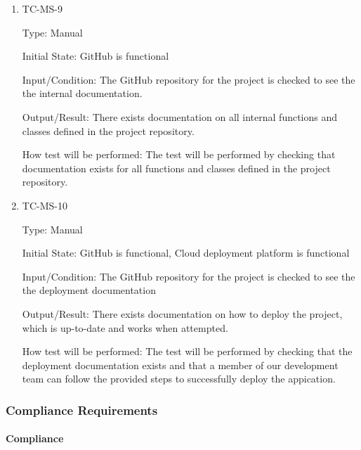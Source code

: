 \documentclass[12pt, titlepage]{article}
\begin{document}
\begin{enumerate}
  \item{TC-MS-9\\}

    Type: Manual

    Initial State: GitHub is functional

    Input/Condition: The GitHub repository for the project is checked
    to see the the internal documentation.

    Output/Result: There exists documentation on all internal
    functions and classes defined in the project repository.

    How test will be performed: The test will be performed by
    checking that documentation exists for all functions and classes
    defined in the project repository.

  \item{TC-MS-10\\}

    Type: Manual

    Initial State: GitHub is functional, Cloud deployment platform is functional

    Input/Condition: The GitHub repository for the project is checked
    to see the the deployment documentation

    Output/Result: There exists documentation on how to deploy the
    project, which is up-to-date and works when attempted.

    How test will be performed: The test will be performed by
    checking that the deployment documentation exists and that a
    member of our development team can follow the provided steps to
    successfully deploy the appication.

\end{enumerate}

\subsubsection{Compliance Requirements}

\paragraph{Compliance}
\end{document}
